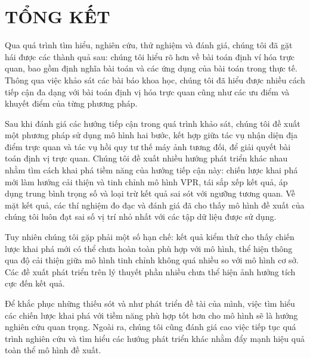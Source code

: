 \chapter{TỔNG KẾT}

Qua quá trình tìm hiểu, nghiên cứu, thử nghiệm và đánh giá, chúng tôi đã gặt hái được các thành quả sau: chúng tôi hiểu rõ hơn về bài toán định ví hóa trực quan, bao gồm định nghĩa bài toán và các ứng dụng của bài toán trong thực tế. Thông qua việc khảo sát các bài báo khoa học, chúng tôi đã hiểu được nhiều cách tiếp cận đa dạng với bài toán định vị hóa trực quan cũng như các ưu điểm và khuyết điểm của từng phương pháp.

Sau khi đánh giá các hướng tiếp cận trong quá trình khảo sát, chúng tôi đề xuất một phương pháp sử dụng mô hình hai bước, kết hợp giữa tác vụ nhận diện địa điểm trực quan và tác vụ hồi quy tư thế máy ảnh tương đối, để giải quyết bài toán định vị trực quan. Chúng tôi đề xuất nhiều hướng phát triển khác nhau nhằm tìm cách khai phá tiềm năng của hướng tiếp cận này: chiến lược khai phá mới làm hướng cải thiện và tinh chỉnh mô hình VPR, tái sắp xếp kết quả, áp dụng trung bình trọng số và loại trừ kết quả sai sót với ngưỡng tương quan. Về mặt kết quả, các thí nghiệm đo đạc và đánh giá đã cho thấy mô hình đề xuất của chúng tôi luôn đạt sai số vị trí nhỏ nhất với các tập dữ liệu được sử dụng.

Tuy nhiên chúng tôi gặp phải một số hạn chế: kết quả kiểm thử cho thấy chiến lược khai phá mới có thể chưa hoàn toàn phù hợp với mô hình, thể hiện thông qua độ cải thiện giữa mô hình tinh chỉnh không quá nhiều so với mô hình cơ sở. Các đề xuất phát triển trên lý thuyết phần nhiều chưa thể hiện ảnh hưởng tích cực đến kết quả.

Để khắc phục những thiếu sót và như phát triển đề tài của mình, việc tìm hiểu các chiến lược khai phá với tiềm năng phù hợp tốt hơn cho mô hình sẽ là hướng nghiên cứu quan trọng. Ngoài ra, chúng tôi cũng đánh giá cao việc tiếp tục quá trình nghiên cứu và tìm hiểu các hướng phát triển khác nhằm đẩy mạnh hiệu quả toàn thể mô hình đề xuất.

